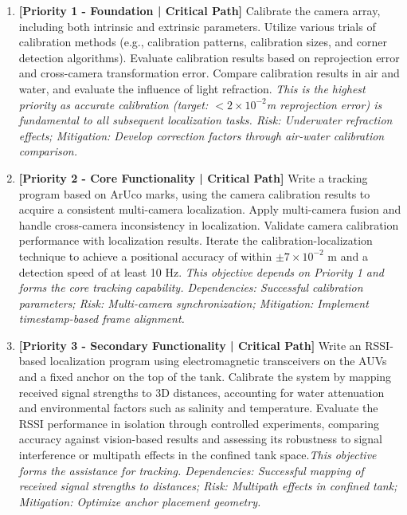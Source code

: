 \documentclass[11pt]{article}
\begin{document}
    \begin{enumerate}
        \item \textbf{[Priority 1 - Foundation | Critical Path]} Calibrate the camera array, including both intrinsic and extrinsic parameters. Utilize various trials of calibration methods (e.g., calibration patterns, calibration sizes, and corner detection algorithms). Evaluate calibration results based on reprojection error and cross-camera transformation error. Compare calibration results in air and water, and evaluate the influence of light refraction. \textit{This is the highest priority as accurate calibration (target: $<2\times10^{-2}$m reprojection error) is fundamental to all subsequent localization tasks. Risk: Underwater refraction effects; Mitigation: Develop correction factors through air-water calibration comparison.}

        \item \textbf{[Priority 2 - Core Functionality | Critical Path]} Write a tracking program based on ArUco marks, using the camera calibration results to acquire a consistent multi-camera localization. Apply multi-camera fusion and handle cross-camera inconsistency in localization. Validate camera calibration performance with localization results. Iterate the calibration-localization technique to achieve a positional accuracy of within $\pm 7\times10^{-2}$ m and a detection speed of at least 10 Hz. \textit{This objective depends on Priority 1 and forms the core tracking capability. Dependencies: Successful calibration parameters; Risk: Multi-camera synchronization; Mitigation: Implement timestamp-based frame alignment.}

        \item \textbf{[Priority 3 - Secondary Functionality | Critical Path]} Write an RSSI-based localization program using electromagnetic transceivers on the AUVs and a fixed anchor on the top of the tank. Calibrate the system by mapping received signal strengths to 3D distances, accounting for water attenuation and environmental factors such as salinity and temperature. Evaluate the RSSI performance in isolation through controlled experiments, comparing accuracy against vision-based results and assessing its robustness to signal interference or multipath effects in the confined tank space.\textit{This objective forms the assistance for tracking. Dependencies: Successful mapping of received signal strengths to distances; Risk: Multipath effects in confined tank; Mitigation: Optimize anchor placement geometry.}


\end{enumerate}
\end{document}
